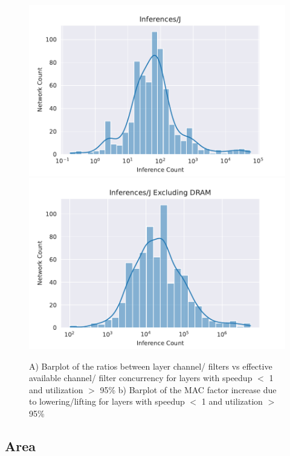\begin{figure}
    \centering
    \includegraphics[scale=0.48]{Plots/energy/inferences.pdf}
    \hspace{0.1cm} 
    \includegraphics[scale=0.48]{Plots/energy/inferences_wo_dram.pdf}
    \caption{A) Barplot of the ratios between layer channel/ filters vs effective available channel/ filter concurrency for layers with speedup $<$ 1 and utilization $>$ 95\% b) Barplot of the MAC factor increase due to lowering/lifting for layers with speedup $<$ 1 and utilization $>$ 95\%}
    \label{fig:speedup}
\end{figure}

\subsection{Area}

\label{chap:conv_gemm_equiv:overhead}

